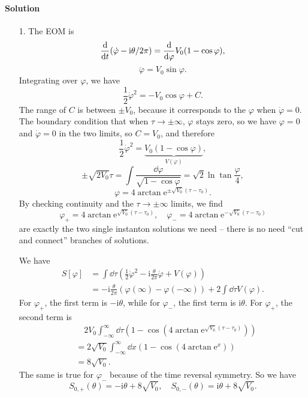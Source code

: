 \documentclass[hyperref, a4paper]{article}
\newcommand*{\ii}{\mathrm{i}}
\newcommand*{\ee}{\mathrm{e}}
\begin{document}
\paragraph{Solution} \begin{itemize}
\item[1.] The EOM is 
\[
    \dv{t} (\dot{\varphi} - \ii \theta / 2\pi) = \dv{\varphi} V_0 (1 - \cos \varphi),
\]
\begin{equation}
    \ddot{\varphi} = V_0 \sin \varphi.
\end{equation}
Integrating over $\varphi$, we have 
\begin{equation}
    \frac{1}{2} \dot{\varphi}^2 = - V_0 \cos \varphi + C.
\end{equation}
The range of $C$ is between $\pm V_0$,
because it corresponds to the $\varphi$ when $\dot{\varphi} = 0$.
The boundary condition that when $\tau \to \pm \infty$, 
$\varphi$ stays zero,
so we have $\varphi = 0$ and $\dot{\varphi} = 0$ in the two limits,
so $C = V_0$,
and therefore 
\begin{equation}
    \frac{1}{2} \dot{\varphi}^2 = \underbrace{V_0 (1 - \cos \varphi)}_{V(\varphi)} ,
\end{equation}
\[
    \pm \sqrt{2 V_0} \tau = \int \frac{\dd{\varphi}}{\sqrt{1 - \cos \varphi}}
    = \sqrt{2} \ln \tan \frac{\varphi}{4},
\]
\[
    \varphi = 4 \arctan \ee^{\pm \sqrt{V_0} (\tau - \tau_0)}.
\]
By checking continuity and the $\tau \to \pm \infty$ limits,
we find 
\begin{equation}
    \varphi_+ = 4 \arctan \ee^{\sqrt{V_0} (\tau - \tau_0)},
    \quad \varphi_- = 4 \arctan \ee^{- \sqrt{V_0} (\tau - \tau_0)}
\end{equation}
are exactly the two single instanton solutions we need -- 
there is no need ``cut and connect'' branches of solutions.

We have 
\[
    \begin{aligned}
        S[\varphi] &= \int \dd{\tau} \left( \frac{1}{2} \dot{\varphi}^2 
        - \ii \frac{\theta}{2\pi} \dot{\varphi}
        + V(\varphi) \right) \\
        &= - \ii \frac{\theta}{2\pi} (\varphi(\infty) - \varphi(-\infty)) + 
        2 \int \dd{\tau} V(\varphi).
    \end{aligned}
\]
For $\varphi_+$, the first term is $- \ii \theta$, 
while for $\varphi_-$, the first term is $\ii \theta$.
For $\varphi_+$, the second term is 
\[
    \begin{aligned}
        &\quad 2 V_0 \int^\infty_{-\infty} \dd{\tau} \left( 
            1 - \cos(4 \arctan \ee^{\sqrt{V_0} (\tau - \tau_0)})
        \right) \\
        &= 2 \sqrt{V_0} \int_{-\infty}^\infty \dd{x}  \left( 
            1 - \cos(4 \arctan \ee^{x})
        \right) \\
        &= 8 \sqrt{V_0}.
    \end{aligned}
\]
The same is true for $\varphi_{-}$ because of the time reversal symmetry.
So we have 
\begin{equation}
    S_{0, +}(\theta) = - \ii \theta + 8 \sqrt{V_0}, \quad 
    S_{0, -}(\theta) =   \ii \theta + 8 \sqrt{V_0}.
    \label{eq:single-instanton}
\end{equation}


\end{itemize}
\end{document}

